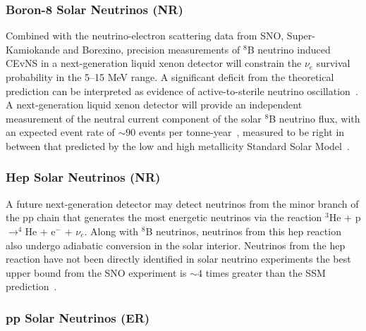 \subsubsection{Boron-8 Solar Neutrinos (NR)}

Combined with the neutrino-electron scattering data from SNO, Super-Kamiokande and Borexino, precision measurements of $^8$B neutrino induced CEvNS in a next-generation liquid xenon detector will constrain the $\nu_e$ survival probability in the 5--15 MeV range. A significant deficit from the theoretical prediction can be interpreted as evidence of active-to-sterile neutrino oscillation~\cite{Billard:2014yka}. A next-generation liquid xenon detector will provide an independent measurement of the neutral current component of the solar $^8$B neutrino flux, with an expected event rate of $\sim 90$ events per tonne-year~\cite{Aalbers:2016jon}, measured to be right in between that predicted by the low and high metallicity Standard Solar Model~\cite{Agostini:2017cav,Agostini:2018uly,Aprile:2020thb}.

\subsubsection{Hep Solar Neutrinos (NR)}

A future next-generation detector may detect neutrinos from the minor branch of the pp chain that generates the most energetic neutrinos via the reaction $^{3}$He + p $\rightarrow ^{4}$He + e$^-$ + $\nu_e$. Along with $^{8}$B neutrinos, neutrinos from this hep reaction also undergo adiabatic conversion in the solar interior. Neutrinos from the hep reaction have not been directly identified in solar neutrino experiments the best upper bound from the SNO experiment is $\sim 4$ times greater than the SSM prediction~\cite{Aharmim:2006wq}. 

\subsubsection{pp Solar Neutrinos (ER)}\label{sec:ppneutrinos}

